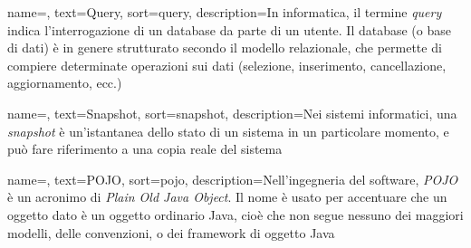 {
    name=,
    text=Query,
    sort=query,
    description={In informatica, il termine \textit{query} indica l'interrogazione di un database da parte di un utente. Il database (o base di dati) è in genere strutturato secondo il modello relazionale, che permette di compiere determinate operazioni sui dati (selezione, inserimento, cancellazione, aggiornamento, ecc.)}
}

{
    name=,
    text=Snapshot,
    sort=snapshot,
    description={Nei sistemi informatici, una \textit{snapshot} è un'istantanea dello stato di un sistema in un particolare momento, e può fare riferimento a una copia reale del sistema}
}

{
    name=,
    text=POJO,
    sort=pojo,
    description={Nell'ingegneria del software, \textit{POJO} è un acronimo di \textit{Plain Old Java Object}. Il nome è usato per accentuare che un oggetto dato è un oggetto ordinario Java, cioè che non segue nessuno dei maggiori modelli, delle convenzioni, o dei \gls{framework} di oggetto Java}
}

